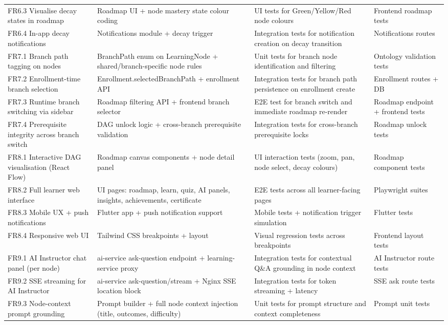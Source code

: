 \begin{longtable}{p{3cm}p{3.5cm}p{3cm}p{4.5cm}}
FR6.3 Visualise decay states in roadmap & Roadmap UI + node mastery state colour coding & UI tests for Green/Yellow/Red node colours & Frontend roadmap tests \\
FR6.4 In-app decay notifications & Notifications module + decay trigger & Integration tests for notification creation on decay transition & Notifications routes \\
FR7.1 Branch path tagging on nodes & BranchPath enum on LearningNode + shared/branch-specific node rules & Unit tests for branch node identification and filtering & Ontology validation tests \\
FR7.2 Enrollment-time branch selection & Enrollment.selectedBranchPath + enrollment API & Integration tests for branch path persistence on enrollment create & Enrollment routes + DB \\
FR7.3 Runtime branch switching via sidebar & Roadmap filtering API + frontend branch selector & E2E test for branch switch and immediate roadmap re-render & Roadmap endpoint + frontend tests \\
FR7.4 Prerequisite integrity across branch switch & DAG unlock logic + cross-branch prerequisite validation & Integration tests for cross-branch prerequisite locks & Roadmap unlock tests \\
FR8.1 Interactive DAG visualisation (React Flow) & Roadmap canvas components + node detail panel & UI interaction tests (zoom, pan, node select, decay colours) & Roadmap component tests \\
FR8.2 Full learner web interface & UI pages: roadmap, learn, quiz, AI panels, insights, achievements, certificate & E2E tests across all learner-facing pages & Playwright suites \\
FR8.3 Mobile UX + push notifications & Flutter app + push notification support & Mobile tests + notification trigger simulation & Flutter tests \\
FR8.4 Responsive web UI & Tailwind CSS breakpoints + layout & Visual regression tests across breakpoints & Frontend layout tests \\
FR9.1 AI Instructor chat panel (per node) & ai-service ask-question endpoint + learning-service proxy & Integration tests for contextual Q\&A grounding in node context & AI Instructor route tests \\
FR9.2 SSE streaming for AI Instructor & ai-service ask-question/stream + Nginx SSE location block & Integration tests for token streaming + latency & SSE ask route tests \\
FR9.3 Node-context prompt grounding & Prompt builder + full node context injection (title, outcomes, difficulty) & Unit tests for prompt structure and context completeness & Prompt unit tests \\

\end{longtable}

